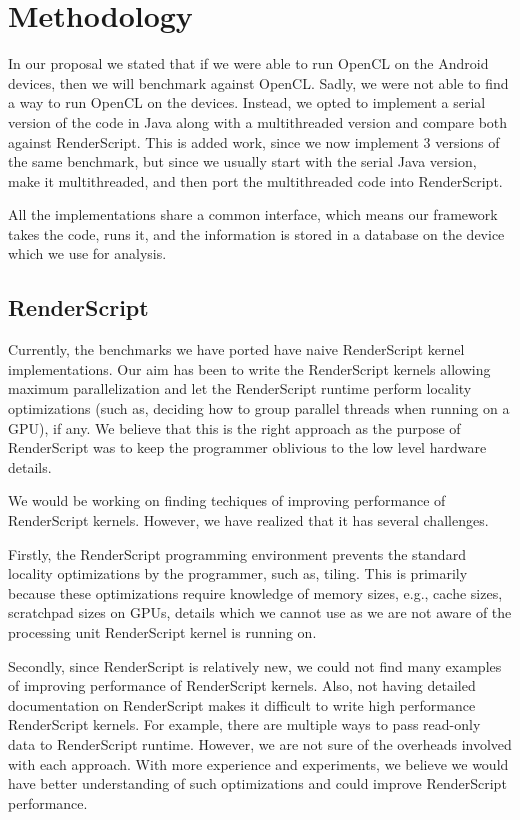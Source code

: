 
\section*{Methodology}

In our proposal we stated that if we were able to run OpenCL on the Android devices, then
  we will benchmark against OpenCL.
Sadly, we were not able to find a way to run OpenCL on the devices.
Instead, we opted to implement a serial version of the code in Java along with a multithreaded version
  and compare both against RenderScript.
This is added work, since we now implement 3 versions of the same benchmark, but since we usually
  start with the serial Java version, make it multithreaded, and then port the multithreaded code
  into RenderScript.

All the implementations share a common interface, which means our framework takes the code,
  runs it, and the information is stored in a database on the device which we use for analysis.

\subsection*{RenderScript}
Currently, the benchmarks we have ported have naive RenderScript kernel
implementations. Our aim has been to write the RenderScript kernels allowing maximum
parallelization and let the RenderScript runtime  perform locality
optimizations (such as, deciding how to group parallel threads when running on a
GPU), if any. We believe that this is the right approach as
the purpose of RenderScript was to keep the programmer oblivious to the low
level hardware details.

We would be working on finding techiques of improving performance of
RenderScript kernels. However, we have realized that it has several challenges.

Firstly, the RenderScript programming environment prevents the standard locality
optimizations by the programmer, such as, tiling. This is primarily because
these optimizations require knowledge of memory sizes, e.g., cache sizes,
scratchpad sizes on GPUs, details which we cannot use as we are not aware of the
processing unit RenderScript kernel is running on.

Secondly, since RenderScript is relatively new, we could not find many examples
of improving performance of RenderScript kernels. Also, not having detailed
documentation on RenderScript makes it difficult to write high performance
RenderScript kernels. For example, there are multiple ways to pass read-only
data to RenderScript runtime. However, we are not sure of the overheads involved
with each approach. With more experience and
experiments, we believe we would have better understanding of such optimizations
and could improve RenderScript performance.

